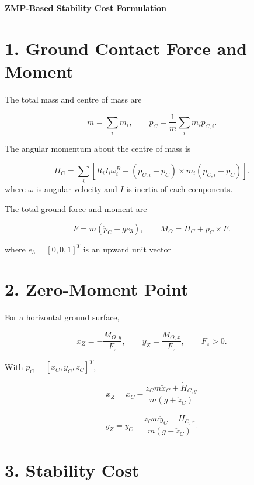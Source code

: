 \documentclass[10pt]{article}
\begin{document}
\begin{center}
{\Large\textbf{ZMP-Based Stability Cost Formulation}}
\end{center}

\section*{1. Ground Contact Force and Moment}

The total mass and centre of mass are

\begin{equation}
m=\sum_i m_i,
\qquad
p_C=\frac{1}{m}\sum_i m_i p_{C,i}.
\end{equation}

The angular momentum about the centre of mass is

\begin{equation}
H_C=
\sum_i
\left[
R_iI_i\omega_i^B+
(p_{C,i}-p_C)\times m_i(\dot p_{C,i}-\dot p_C)
\right].
\end{equation}
where $\omega$ is angular velocity and $I$ is inertia of each components.

The total ground force and moment are

\begin{equation}
F=m(\ddot p_C+ge_3),
\qquad
M_O=\dot H_C+p_C\times F.
\end{equation}

where $e_3=[0,0,1]^T$ is an upward unit vector

\section*{2. Zero-Moment Point}

For a horizontal ground surface,

\begin{equation}
x_Z=-\frac{M_{O,y}}{F_z},
\qquad
y_Z=\frac{M_{O,x}}{F_z},
\qquad F_z>0.
\end{equation}

With $p_C=[x_C,y_C,z_C]^T$,

\begin{equation}
\boxed{
x_Z=
x_C-
\frac{z_Cm\ddot x_C+\dot H_{C,y}}
{m(g+\ddot z_C)}
}
\end{equation}

\begin{equation}
\boxed{
y_Z=
y_C-
\frac{z_Cm\ddot y_C-\dot H_{C,x}}
{m(g+\ddot z_C)}
}.
\end{equation}

\section*{3. Stability Cost}
\end{document}
